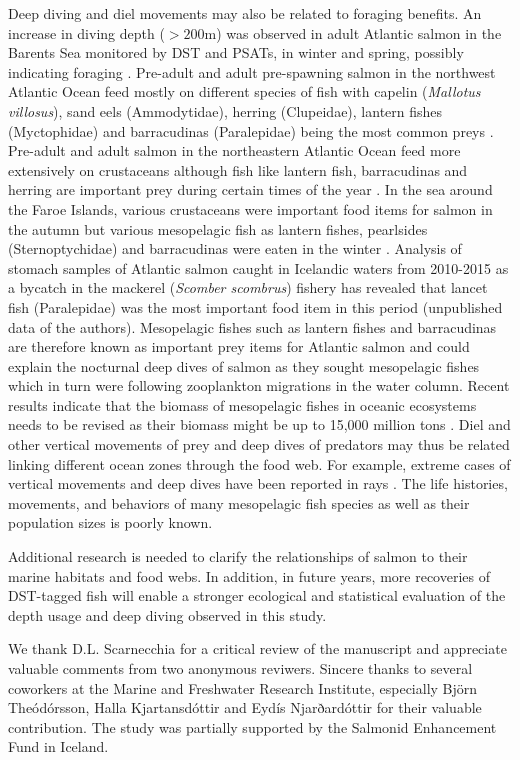 Deep diving and diel movements may also be related to foraging benefits.
An increase in diving depth ($> 200$m) was observed in adult Atlantic salmon in the Barents Sea monitored by DST and PSATs, in winter and spring, possibly indicating foraging \citep{Hedger2017}. 
Pre-adult and adult pre-spawning salmon in the northwest Atlantic Ocean feed mostly on different species of fish with capelin (\textit{Mallotus villosus}), sand eels (Ammodytidae), herring (Clupeidae), lantern fishes (Myctophidae) and barracudinas (Paralepidae) being the most common preys \citep{Rikardsen2011}. 
Pre-adult and adult salmon in the northeastern Atlantic Ocean feed more extensively on crustaceans although fish like lantern fish, barracudinas and herring are important prey during certain times of the year \citep{Rikardsen2011}. 
In the sea around the Faroe Islands, various crustaceans were important food items for salmon in the autumn but various mesopelagic fish as lantern fishes, pearlsides (Sternoptychidae) and barracudinas were eaten in the winter \citep{Jacobsen2001}. 
Analysis of stomach samples of Atlantic salmon caught in Icelandic waters from 2010-2015 as a bycatch in the mackerel (\textit{Scomber scombrus}) fishery has revealed that lancet fish (Paralepidae) was the most important food item in this period (unpublished data of the authors). 
Mesopelagic fishes such as lantern fishes and barracudinas are therefore known as important prey items for Atlantic salmon and could explain the nocturnal deep dives of salmon as they sought mesopelagic fishes which in turn were  following zooplankton migrations in the water column.
Recent results indicate that the biomass of mesopelagic fishes in oceanic ecosystems needs to be revised as their biomass might be up to 15,000 million tons \citep{Irigoien2014}. 
Diel and other vertical movements of prey and deep dives of predators may thus be related linking different ocean zones through the food web. 
For example, extreme cases of vertical movements and deep dives have been reported in rays \citep{Thorrold2014}. 
The life histories, movements, and behaviors of many mesopelagic fish species as well as their population sizes is poorly known. 

Additional research is needed to clarify the relationships of salmon to their marine habitats and food webs. In addition, in future years, more recoveries of DST-tagged fish will enable a stronger ecological and statistical evaluation of the depth usage and deep diving observed in this study. 


\begin{acknowledgements}
We thank D.L. Scarnecchia for a critical review of the manuscript and appreciate valuable comments from two anonymous reviwers. Sincere thanks to several coworkers at the Marine and Freshwater Research Institute, especially Björn Theódórsson, Halla Kjartansdóttir and Eydís Njarðardóttir for their valuable contribution.  
The study was partially supported by the Salmonid Enhancement Fund in Iceland.
\end{acknowledgements}


